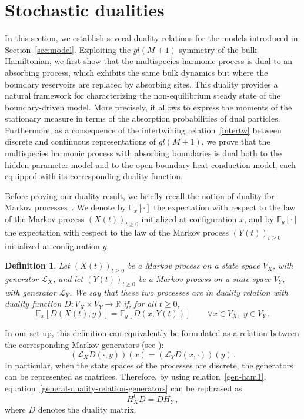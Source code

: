 \documentclass[11pt]{article}
\numberwithin{equation}{section}
\newtheorem{definition}[theorem]{Definition}
\newcommand{\M}{M}
\begin{document}
\section{Stochastic dualities}\label{section-duality}
In this section, we establish several duality relations for the models introduced in Section~\ref{sec:model}. Exploiting the $gl(\M+1)$ symmetry of the bulk Hamiltonian, we first show that the multispecies harmonic process is dual to an absorbing process, which exhibits the same bulk dynamics but where the boundary reservoirs are replaced by absorbing sites. This duality provides a natural framework for characterizing the non-equilibrium steady state of the boundary-driven model.
More precisely, it allows to express
the moments of the stationary measure in terms of the absorption probabilities of dual particles.
Furthermore, as a consequence of the intertwining relation~\eqref{intertw} between discrete and continuous representations of $gl(\M+1)$, we prove that the multispecies harmonic process with absorbing boundaries is dual both to the hidden-parameter model and to the open-boundary heat conduction model, each equipped with its corresponding duality function.

Before proving our duality result, we briefly recall the notion of duality for Markov processes~\cite{dualityBook}. We denote by $\mathbb{E}_{x}[\cdot]$ the expectation with respect to the law of the Markov process $(X(t))_{t\geq 0}$ initialized at configuration $x$, and by $\mathbb{E}_{y}[\cdot]$ the expectation with respect to the law of the Markov process $(Y(t))_{t\geq 0}$ initialized at configuration $y$.
\begin{definition}
Let $(X(t))_{t\geq 0}$ be a Markov process on a state space $V_{X}$, with generator $\mathcal{L}_X$, and let $(Y(t))_{t\geq 0}$ be a Markov process on a state space $V_{Y}$, with generator ${\mathcal{L}_Y}$. We say that these two processes are in duality relation with duality function $D:V_{X}\times V_{Y}\to \mathbb{R}$ if, for all $t\geq 0$,
\begin{equation}\label{duality-defintion-via-expectation}
	\mathbb{E}_{x}[D(X(t),y)]=\mathbb{E}_{y}[D(x,Y(t))]\qquad \forall x\in V_{X},\;y\in V_{Y}\,.
\end{equation}
\end{definition}
In our set-up, this definition can equivalently be formulated as a relation between the corresponding Markov generators (see \cite{dualityBook}):
\begin{equation}\label{general-duality-relation-generators}
	\left(\mathcal{L}_{X}D(\cdot,y)\right)(x)=\left(\mathcal{L}_{Y}D(x,\cdot)\right)(y)\,.
\end{equation}
In particular, when the state spaces of the processes are discrete, the generators can be represented as matrices. Therefore, by using relation~\eqref{gen-ham1}, equation~\eqref{general-duality-relation-generators} can be rephrased as
\begin{equation}\label{hamiltonian-duality-general}
	H_{X}^{t}D=D{H}_{Y}\,,
\end{equation}
where $D$ denotes the duality matrix.
\end{document}
